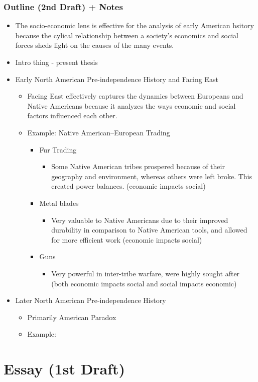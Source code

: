 \documentclass[letterpaper]{article}
\begin{document}
\subsubsection{Outline (2nd Draft) + Notes}
\label{sec:org1a89d64}
\begin{itemize}
\item The socio-economic lens is effective for the analysis of early
American hsitory because the cylical relationship between a society's
economics and social forces sheds light on the causes of the many
events.

\item Intro thing - present thesis
\item Early North American Pre-independence History and Facing East

\begin{itemize}
\item Facing East effectively captures the dynamics between Europeans and
Native Americans because it analyzes the ways economic and social
factors influenced each other.
\item Example: Native American--European Trading

\begin{itemize}
\item Fur Trading

\begin{itemize}
\item Some Native American tribes prospered because of their
geography and environment, whereas others were left broke. This
created power balances. (economic impacts social)
\end{itemize}

\item Metal blades

\begin{itemize}
\item Very valuable to Native Americans due to their improved
durability in comparison to Native American tools, and allowed
for more efficient work (economic impacts social)
\end{itemize}

\item Guns

\begin{itemize}
\item Very powerful in inter-tribe warfare, were highly sought after
(both economic impacts social and social impacts economic)
\end{itemize}
\end{itemize}
\end{itemize}

\item Later North American Pre-independence History

\begin{itemize}
\item Primarily American Paradox
\item Example:
\end{itemize}
\end{itemize}

\section{Essay (1st Draft)}
\label{sec:orgf8117c3}
\end{document}
